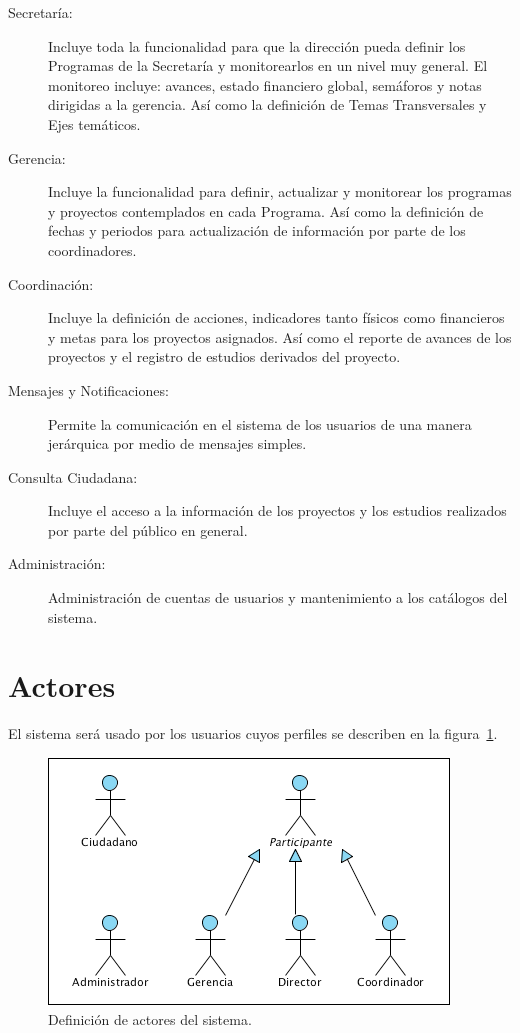 \documentclass[10pt]{book}
\begin{document}
\begin{description}
	\item[Secretaría:] Incluye toda la funcionalidad para que la dirección pueda definir los Programas de la Secretaría y monitorearlos en un nivel muy general. El monitoreo incluye: avances, estado financiero global, semáforos y notas dirigidas a la gerencia. Así como la definición de Temas Transversales y Ejes temáticos.
	\item[Gerencia:] Incluye la funcionalidad para definir, actualizar y monitorear los programas y proyectos contemplados en cada Programa. Así como la definición de fechas y periodos para actualización de información por parte de los coordinadores.
	\item[Coordinación:] Incluye la definición de acciones, indicadores tanto físicos como financieros y metas para los proyectos asignados. Así como el reporte de avances de los proyectos y el registro de estudios derivados del proyecto.
	\item[Mensajes y Notificaciones:] Permite la comunicación en el sistema de los usuarios de una manera jerárquica por medio de mensajes simples.
	\item[Consulta Ciudadana:] Incluye el acceso a la información de los proyectos y los estudios realizados por parte del público en general.
	\item[Administración:] Administración de cuentas de usuarios y mantenimiento a los catálogos del sistema.
\end{description}

\section{Actores}

El sistema será usado por los usuarios cuyos perfiles se describen en la figura~\ref{fig:actores}.

\begin{figure}[htbp!]
	\begin{center}
		\includegraphics[width=.5\textwidth]{images/actores}
		\caption{Definición de actores del sistema.}
		\label{fig:actores}
	\end{center}
\end{figure}
\end{document}
